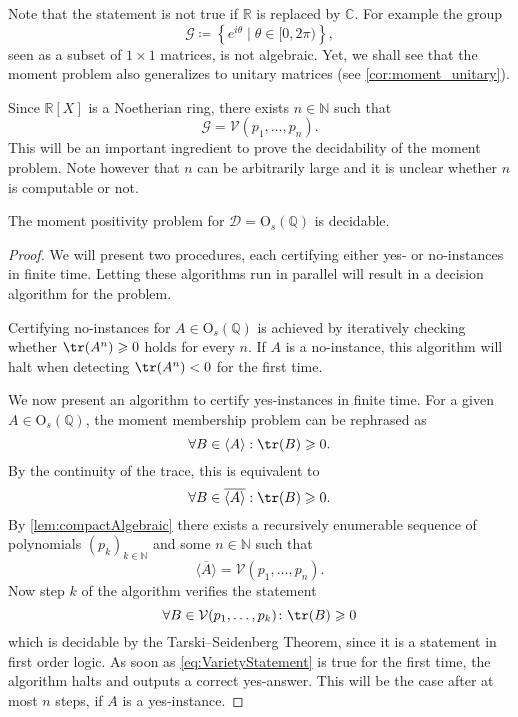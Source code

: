 Note that the statement is not true if $\mathbb{R}$ is replaced by $\mathbb{C}$. For example the group
$$\mathcal{G} \coloneqq \left\{e^{i \theta}\mid \theta \in [0,2\pi)\right\},$$
seen as a subset of $1 \times 1$ matrices, is not algebraic. Yet, we shall see that the moment problem also generalizes to unitary matrices (see \cref{cor:moment_unitary}).

Since $\mathbb{R}[X]$ is a Noetherian ring, there exists $n \in \mathbb{N}$ such that 
$$ \mathcal{G} = \mathcal{V}(p_1,\ldots, p_n).$$
This will be an important ingredient to prove the decidability of the moment problem. Note however that $n$ can be arbitrarily large and it is unclear whether $n$ is computable or not.


\begin{theorem}
\label{thm:moment_orthogonal}
The moment positivity problem for  $\mathcal D=\mathrm{O}_s(\mathbb{Q})$  is decidable.
\end{theorem}
\begin{proof}
We will present two procedures, each certifying either yes- or no-instances in finite time. Letting these algorithms run in parallel will result in a decision algorithm for the problem.

Certifying no-instances for $A \in \mathrm{O}_s(\mathbb{Q})$ is achieved by iteratively checking whether $\tr(A^n) \geqslant 0$ holds for every  $n$. If $A$ is a no-instance, this algorithm will halt when detecting $\tr(A^n) < 0$ for the first time.

We now present an algorithm to certify yes-instances in finite time. For a given $A \in \mathrm{O}_s(\mathbb{Q})$, the moment membership problem can be rephrased  as
$$\forall B \in \langle A \rangle: \tr(B) \geqslant 0.$$
By the continuity of the trace, this is equivalent to 
\begin{equation}
\label{eq:firstOrderStatement}
\forall B \in \overline{\langle A \rangle}: \tr(B) \geqslant 0.
\end{equation}
By \cref{lem:compactAlgebraic} there exists a recursively enumerable sequence of polynomials $(p_k)_{k \in \mathbb{N}}$ and some $n \in \mathbb{N}$ such that
$$\overline{\langle A\rangle} = \mathcal{V}(p_1,\ldots, p_n).$$
Now step $k$ of the algorithm verifies the statement
\begin{equation}\label{eq:VarietyStatement}
\forall B \in \mathcal{V}(p_1, \ldots, p_k)\colon \tr(B) \geqslant 0
\end{equation}
which is decidable by the Tarski--Seidenberg Theorem, since it is a statement in first order logic. As soon  as  \cref{eq:VarietyStatement} is true for the first time, the algorithm halts and outputs a correct yes-answer. This  will be the case after at most $n$ steps, if $A$ is a yes-instance.
\end{proof}


